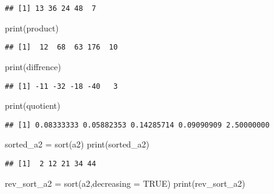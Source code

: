 \documentclass[
]{article}
\newenvironment{Shaded}{\begin{snugshade}}{\end{snugshade}}
\newcommand{\AttributeTok}[1]{\textcolor[rgb]{0.77,0.63,0.00}{#1}}
\newcommand{\ConstantTok}[1]{\textcolor[rgb]{0.00,0.00,0.00}{#1}}
\newcommand{\FunctionTok}[1]{\textcolor[rgb]{0.00,0.00,0.00}{#1}}
\newcommand{\NormalTok}[1]{#1}
\newcommand{\OtherTok}[1]{\textcolor[rgb]{0.56,0.35,0.01}{#1}}
\begin{document}
\begin{verbatim}
## [1] 13 36 24 48  7
\end{verbatim}

\begin{Shaded}
\begin{Highlighting}[]
\FunctionTok{print}\NormalTok{(product)}
\end{Highlighting}
\end{Shaded}

\begin{verbatim}
## [1]  12  68  63 176  10
\end{verbatim}

\begin{Shaded}
\begin{Highlighting}[]
\FunctionTok{print}\NormalTok{(diffrence)}
\end{Highlighting}
\end{Shaded}

\begin{verbatim}
## [1] -11 -32 -18 -40   3
\end{verbatim}

\begin{Shaded}
\begin{Highlighting}[]
\FunctionTok{print}\NormalTok{(quotient)}
\end{Highlighting}
\end{Shaded}

\begin{verbatim}
## [1] 0.08333333 0.05882353 0.14285714 0.09090909 2.50000000
\end{verbatim}

\begin{Shaded}
\begin{Highlighting}[]
\NormalTok{sorted\_a2 }\OtherTok{=} \FunctionTok{sort}\NormalTok{(a2)}
\FunctionTok{print}\NormalTok{(sorted\_a2)}
\end{Highlighting}
\end{Shaded}

\begin{verbatim}
## [1]  2 12 21 34 44
\end{verbatim}

\begin{Shaded}
\begin{Highlighting}[]
\NormalTok{rev\_sort\_a2 }\OtherTok{=} \FunctionTok{sort}\NormalTok{(a2,}\AttributeTok{decreasing =} \ConstantTok{TRUE}\NormalTok{)}
\FunctionTok{print}\NormalTok{(rev\_sort\_a2)}
\end{Highlighting}
\end{Shaded}
\end{document}
